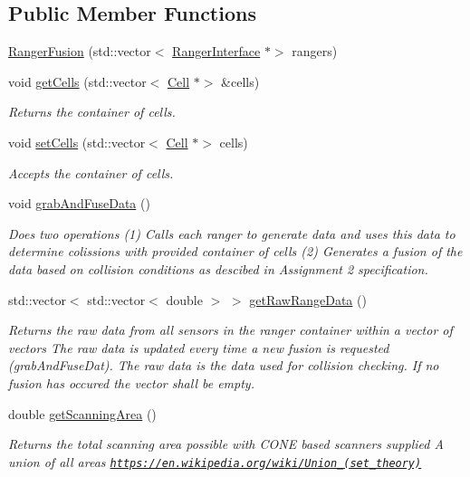 \subsection*{Public Member Functions}
\begin{DoxyCompactItemize}
\item 
\hyperlink{classRangerFusion_ae06d13fa52742f42e138b386e5022168}{Ranger\+Fusion} (std\+::vector$<$ \hyperlink{classRangerInterface}{Ranger\+Interface} $\ast$$>$ rangers)
\item 
void \hyperlink{classRangerFusion_aaf0f90048ff744580eeb73a2bf3a38f7}{get\+Cells} (std\+::vector$<$ \hyperlink{classCell}{Cell} $\ast$$>$ \&cells)
\begin{DoxyCompactList}\small\item\em Returns the container of cells. \end{DoxyCompactList}\item 
void \hyperlink{classRangerFusion_a9b69869bd1e3bca155bcecbad5ea463b}{set\+Cells} (std\+::vector$<$ \hyperlink{classCell}{Cell} $\ast$$>$ cells)
\begin{DoxyCompactList}\small\item\em Accepts the container of cells. \end{DoxyCompactList}\item 
\mbox{\label{classRangerFusion_aa9265f72bc3572567c9cf98cf6d9f0e1}} 
void \hyperlink{classRangerFusion_aa9265f72bc3572567c9cf98cf6d9f0e1}{grab\+And\+Fuse\+Data} ()
\begin{DoxyCompactList}\small\item\em Does two operations (1) Calls each ranger to generate data and uses this data to determine colissions with provided container of cells (2) Generates a \textquotesingle{}fusion\textquotesingle{} of the data based on collision conditions as descibed in Assignment 2 specification. \end{DoxyCompactList}\item 
std\+::vector$<$ std\+::vector$<$ double $>$ $>$ \hyperlink{classRangerFusion_a5780383fdffe121a7a2372a047819ba9}{get\+Raw\+Range\+Data} ()
\begin{DoxyCompactList}\small\item\em Returns the raw data from all sensors in the ranger container within a vector of vectors The raw data is updated every time a new fusion is requested (grab\+And\+Fuse\+Dat). The raw data is the data used for collision checking. If no fusion has occured the vector shall be empty. \end{DoxyCompactList}\item 
double \hyperlink{classRangerFusion_a7215e5405e808b5a853984e2b70ed6ad}{get\+Scanning\+Area} ()
\begin{DoxyCompactList}\small\item\em Returns the total scanning area possible with C\+O\+NE based scanners supplied A union of all areas \href{https://en.wikipedia.org/wiki/Union_(set_theory)}{\tt https\+://en.\+wikipedia.\+org/wiki/\+Union\+\_\+(set\+\_\+theory)} \end{DoxyCompactList}\end{DoxyCompactItemize}



